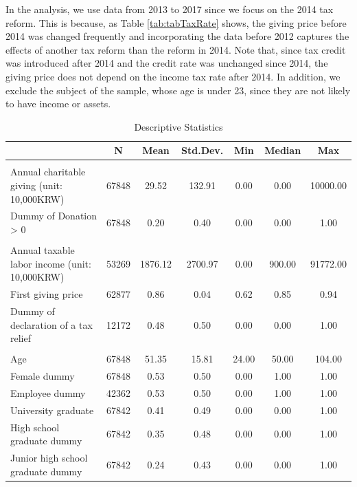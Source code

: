 \documentclass[
  11pt,
  a4paper,
]{article}
\begin{document}
In the analysis, we use data from 2013 to 2017 since we focus on the 2014 tax reform. This is because, as Table \ref{tab:tabTaxRate} shows, the giving price before 2014 was changed frequently and incorporating the data before 2012 captures the effects of another tax reform than the reform in 2014. Note that, since tax credit was introduced after 2014 and the credit rate was unchanged since 2014, the giving price does not depend on the income tax rate after 2014.
In addition, we exclude the subject of the sample, whose age is under 23, since they are not likely to have income or assets.

\begin{table}

\caption{\label{tab:SummaryCovariate}Descriptive Statistics}
\centering
\fontsize{9}{11}\selectfont
\begin{tabular}[t]{lcccccc}
\toprule
 & N & Mean & Std.Dev. & Min & Median & Max\\
\midrule
\addlinespace[0.3em]
\multicolumn{7}{l}{\textbf{Charitable Donations}}\\
\hspace{1em}Annual charitable giving (unit: 10,000KRW) & 67848 & 29.52 & 132.91 & 0.00 & 0.00 & 10000.00\\
\hspace{1em}Dummy of Donation > 0 & 67848 & 0.20 & 0.40 & 0.00 & 0.00 & 1.00\\
\addlinespace[0.3em]
\multicolumn{7}{l}{\textbf{Income, giving price, and tax report}}\\
\hspace{1em}Annual taxable labor income (unit: 10,000KRW) & 53269 & 1876.12 & 2700.97 & 0.00 & 900.00 & 91772.00\\
\hspace{1em}First giving price & 62877 & 0.86 & 0.04 & 0.62 & 0.85 & 0.94\\
\hspace{1em}Dummy of declaration of a tax relief & 12172 & 0.48 & 0.50 & 0.00 & 0.00 & 1.00\\
\addlinespace[0.3em]
\multicolumn{7}{l}{\textbf{Individual Characteristics}}\\
\hspace{1em}Age & 67848 & 51.35 & 15.81 & 24.00 & 50.00 & 104.00\\
\hspace{1em}Female dummy & 67848 & 0.53 & 0.50 & 0.00 & 1.00 & 1.00\\
\hspace{1em}Employee dummy & 42362 & 0.53 & 0.50 & 0.00 & 1.00 & 1.00\\
\hspace{1em}University graduate & 67842 & 0.41 & 0.49 & 0.00 & 0.00 & 1.00\\
\hspace{1em}High school graduate dummy & 67842 & 0.35 & 0.48 & 0.00 & 0.00 & 1.00\\
\hspace{1em}Junior high school graduate dummy & 67842 & 0.24 & 0.43 & 0.00 & 0.00 & 1.00\\
\bottomrule
\end{tabular}
\end{table}
\end{document}
